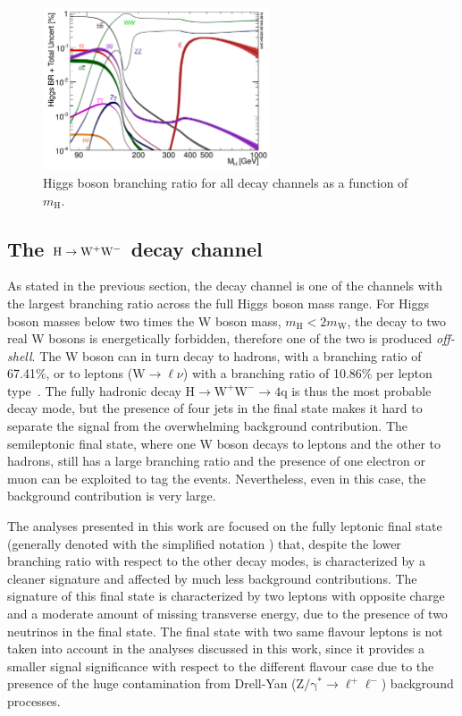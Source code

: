 \begin{figure}[htb]
\centering
\includegraphics[width=0.6\textwidth]{images/Higgs_BR.pdf}
\caption{Higgs boson branching ratio for all decay channels as a function of $m_\mathrm{H}$.}\label{fig:higgs_br}
\end{figure}



\subsection[The \hww decay channel]{The \boldmath${\mathrm{H}\to\mathrm{W^+W^-}}$ decay channel}\label{sec:HWW}
As stated in the previous section, the \hww decay channel is one of the channels with the largest branching ratio across the full Higgs boson mass range. For Higgs boson masses below two times the W boson mass, $m_\mathrm{H} < 2m_\mathrm{W}$, the decay to two real W bosons is energetically forbidden, therefore one of the two is produced \emph{off-shell}. The W boson can in turn decay to hadrons, with a branching ratio of 67.41\%, or to leptons ($\mathrm{W}\to\ell\nu$) with a branching ratio of 10.86\% per lepton type~\cite{pdg2016}. The fully hadronic decay $\mathrm{H\to W^+W^- \to 4q}$ is thus the most probable decay mode, but the presence of four jets in the final state makes it hard to separate the signal from the overwhelming background contribution. The semileptonic final state, where one W boson decays to leptons and the other to hadrons, still has a large branching ratio and the presence of one electron or muon can be exploited to tag the events. Nevertheless, even in this case, the background contribution is very large.

The analyses presented in this work are focused on the fully leptonic final state (generally denoted with the simplified notation \hwwllnn) that, despite the lower branching ratio with respect to the other decay modes, is characterized by a cleaner signature and affected by much less background contributions. The signature of this final state is characterized by two leptons with opposite charge and a moderate amount of missing transverse energy, due to the presence of two neutrinos in the final state. The final state with two same flavour leptons is not taken into account in the analyses discussed in this work, since it provides a smaller signal significance with respect to the different flavour case due to the presence of the huge contamination from Drell-Yan ($\mathrm{Z/\gamma^* \to \ell^+\ell^-}$) background processes.

